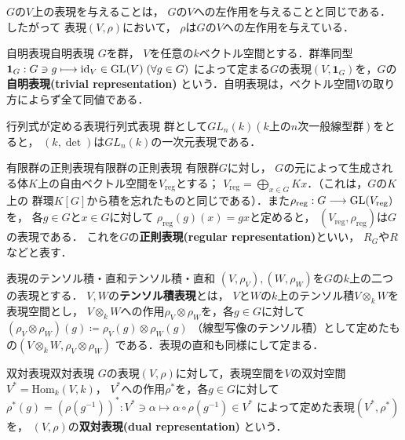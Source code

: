 \documentclass[a4paper,thmnumbering=section,eqnumbering=section]{summary-ja}
\newcommand{\gl}{\textrm{GL}}
\newcommand{\reg}{\textrm{reg}}
\begin{document}
\begin{remark}
    $G$の$V$上の表現を与えることは， $G$の$V$への左作用を与えることと同じである．したがって
    表現$(V,\rho)$において， $\rho$は$G$の$V$への左作用を与えている．
\end{remark}

\begin{example}{自明表現}{自明表現}
    $G$を群， $V$を任意の$k$ベクトル空間とする．群準同型
    $\mathbf{1}_G:G\ni g \longmapsto \id_{V}\in \gl(V)\; (\forall g\in G)$
    によって定まる$G$の表現$(V,\mathbf{1}_G)$を，$G$の\textbf{自明表現(trivial representation)}
    という．自明表現は，ベクトル空間$V$の取り方によらず全て同値である．
\end{example}

\begin{example}{行列式が定める表現}{行列式表現}
    群として$GL_n(k)(k\text{上の}n\text{次一般線型群})$をとると，
    $(k, \det)$は$GL_n(k)$の一次元表現である．
\end{example}


\begin{example}{有限群の正則表現}{有限群の正則表現}
    有限群$G$に対し， $G$の元によって生成される体$K$上の自由ベクトル空間を$V_{\text{reg}}$とする；
    $V_{\text{reg}}=\bigoplus_{x\in G}Kx$．（これは，$G$の$K$上の
    群環$K[G]$から積を忘れたものと同じである）．また$\rho_{\reg}:G\ri \gl(V_{\reg})$を，
    各$g\in G$と$x\in G$に対して
    $\rho_{\reg}(g)(x) = gx$と定めると， $(V_\reg, \rho_\reg)$は$G$の表現である．
    これを$G$の\textbf{正則表現(regular representation)}といい， $R_G$や$R$などと表す．
\end{example}


\begin{example}{表現のテンソル積・直和}{テンソル積・直和}
    $(V,\rho_V),(W,\rho_W)$を$G$の$k$上の二つの表現とする．
    $V,W$の\textbf{テンソル積表現}とは，
    $V$と$W$の$k$上のテンソル積$V\otimes_kW$を表現空間とし，
    $V\otimes_kW$への作用$\rho_V\otimes\rho_W$を，各$g\in G$に対して
    $\left( \rho_V\otimes\rho_W \right)(g) \coloneqq \rho_V(g)\otimes \rho_W(g)$
    （線型写像のテンソル積）として定めたもの$(V\otimes_kW, \rho_V\otimes\rho_W)$
    である．表現の直和も同様にして定まる．
\end{example}

\begin{example}{双対表現}{双対表現}
    $G$の表現$(V,\rho)$に対して，表現空間を$V$の双対空間$V^\ast=\text{Hom}_k(V,k)$，
    $V^\ast$への作用$\rho^\ast$を，各$g\in G$に対して
    $\rho^\ast (g) = (\rho(g^{-1}))^\ast:V^\ast \ni \alpha \longmapsto \alpha \circ \rho(g^{-1}) \in V^\ast $
    によって定めた表現$(V^\ast, \rho^\ast)$を， $(V,\rho)$の\textbf{双対表現(dual representation)}
    という．
\end{example}
\end{document}
